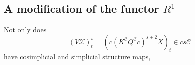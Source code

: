 \documentclass[11pt]{amsart} \renewcommand{\baselinestretch}{1.2}
\theoremstyle{plain}
\newtheorem{prop}[thm]{Proposition}
\numberwithin{equation}{section} %
\theoremstyle{plain}
\newtheorem{prop}[thm]{Proposition}
\numberwithin{equation}{chapter} %
\renewcommand{\ker}{\mathrm{ker}\,}
\renewcommand{\to}{\longrightarrow}
\newcommand{\scrC}{\mathscr{C}}
\newcommand{\calV}{\mathcal{V}}
\newcommand{\calx}{\mathcal{X}}
\newcommand{\calc}{\mathcal{C}}
\newcommand{\citeBOX}[2][]{\cite[\mbox{#1}]{#2}}
\newcommand{\vect}[2]{\calV^{#1}_{#2}}
\newcommand{\algs}{{\scrC\!\textit{\normalfont\textit{om}}}}
\newcommand{\Dendo}{R}
\newcommand{\SubsectionOrSection}[1]{\subsection{#1}}
\begin{document}
\begin{Operations on the Bousfield-Kan spectral sequence}
%
%
%
%
\SubsectionOrSection{A modification of the functor $\Dendo^1$}
Not only does
\[(V\calx)^s_t=(c(K^{\calc}Q^{\calc}c)^{s+2}X)_t\in cs\calc\]
have cosimplicial and simplicial structure maps,

\end{Operations on the Bousfield-Kan spectral sequence}
\end{document}
